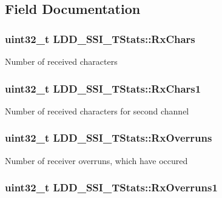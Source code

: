 \subsection{Field Documentation}
\hypertarget{struct_l_d_d___s_s_i___t_stats_ac77cdfd687b197b589fbcd43856aeb98}{
\subsubsection[{Rx\-Chars}]{\setlength{\rightskip}{0pt plus 5cm}uint32\-\_\-t L\-D\-D\-\_\-\-S\-S\-I\-\_\-\-T\-Stats\-::\-Rx\-Chars}}\label{struct_l_d_d___s_s_i___t_stats_ac77cdfd687b197b589fbcd43856aeb98}
Number of received characters \hypertarget{struct_l_d_d___s_s_i___t_stats_ae5221a07e2a6ad3907c34007693dbc55}{
\subsubsection[{Rx\-Chars1}]{\setlength{\rightskip}{0pt plus 5cm}uint32\-\_\-t L\-D\-D\-\_\-\-S\-S\-I\-\_\-\-T\-Stats\-::\-Rx\-Chars1}}\label{struct_l_d_d___s_s_i___t_stats_ae5221a07e2a6ad3907c34007693dbc55}
Number of received characters for second channel \hypertarget{struct_l_d_d___s_s_i___t_stats_aa2125ae18425d2e4bd193b1ee434c8d9}{
\subsubsection[{Rx\-Overruns}]{\setlength{\rightskip}{0pt plus 5cm}uint32\-\_\-t L\-D\-D\-\_\-\-S\-S\-I\-\_\-\-T\-Stats\-::\-Rx\-Overruns}}\label{struct_l_d_d___s_s_i___t_stats_aa2125ae18425d2e4bd193b1ee434c8d9}
Number of receiver overruns, which have occured \hypertarget{struct_l_d_d___s_s_i___t_stats_af0efb66c36bfe377efb18e6ab2fe4559}{
\subsubsection[{Rx\-Overruns1}]{\setlength{\rightskip}{0pt plus 5cm}uint32\-\_\-t L\-D\-D\-\_\-\-S\-S\-I\-\_\-\-T\-Stats\-::\-Rx\-Overruns1}}\label{struct_l_d_d___s_s_i___t_stats_af0efb66c36bfe377efb18e6ab2fe4559}
